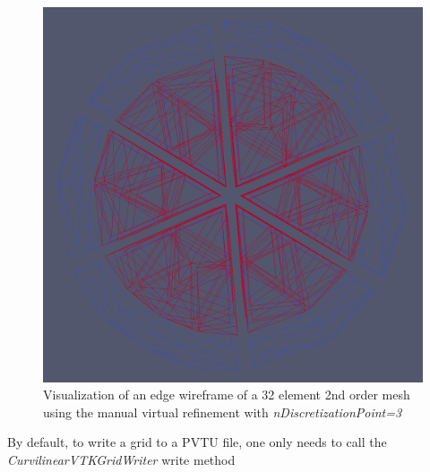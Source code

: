 \begin{figure}
	\centering
	\includegraphics[scale=0.2]{images/gmshreader-vtk-wireframe}
	\caption{Visualization of an edge wireframe of a 32 element 2nd order mesh using the manual virtual refinement with  \textit{nDiscretizationPoint=3}  }
	\label{fig:gmshreader:wireframe}
\end{figure}

\noindent
By default, to write a grid to a PVTU file, one only needs to call the \textit{CurvilinearVTKGridWriter} write method

